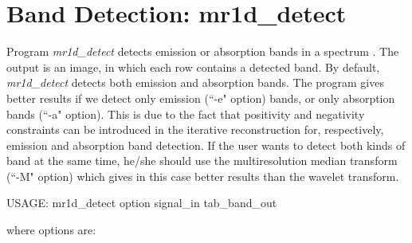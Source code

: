 \section{Band Detection: mr1d\_detect}

Program {\em mr1d\_detect} detects emission or absorption bands in 
a spectrum \cite{starck:sta97}. The output is an image, in which each row
contains a detected band. By default, {\em mr1d\_detect} detects
both emission and absorption bands. The program gives better results
if we detect only emission (``-e" option) bands, or only absorption bands
(``-a" option). This is due to the fact that  positivity and negativity 
constraints can be introduced in the iterative reconstruction for, 
respectively, 
emission and absorption band detection. If the user wants to 
detect both kinds of band at the same time, he/she should 
use the multiresolution
median transform (``-M" option) which gives in this case better results
than the wavelet transform.
{\bf
\begin{center}
 USAGE: mr1d\_detect option signal\_in tab\_band\_out
\end{center}}
where options are:
